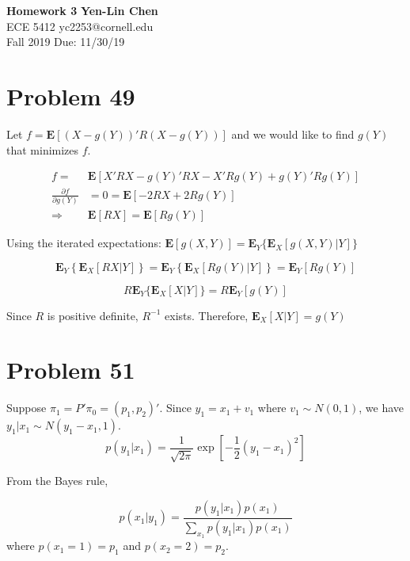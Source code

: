 \documentclass[a4paper, 11pt]{article}
\begin{document}
\noindent
\large\textbf{Homework 3} \hfill \textbf{Yen-Lin Chen} \\
\normalsize ECE 5412 \hfill yc2253@cornell.edu \\
Fall 2019 \hfill Due: 11/30/19\\

\section*{Problem 49}

Let $f = \mathbf{E}[(X-g(Y))'R(X-g(Y))]$ and we would like to find $g(Y)$ that minimizes $f$. 

\begin{equation}
\begin{split}
f = & \mathbf{E}[X'RX - g(Y)'RX - X'Rg(Y) + g(Y)'Rg(Y)]\\
\frac{\partial f}{\partial g(Y)} & = 0 = \mathbf{E}[-2RX + 2Rg(Y)]\\
\Longrightarrow & \mathbf{E}[RX] = \mathbf{E}[Rg(Y)]
\end{split}
\end{equation}

Using the iterated expectations: $\mathbf{E}[g(X,Y)] = \mathbf{E}_Y\{\mathbf{E}_X[g(X,Y)|Y]\}$

\begin{equation}
\mathbf{E}_Y\left\{ \mathbf{E}_X [RX | Y] \right\} = \mathbf{E}_Y\left\{ \mathbf{E}_X [Rg(Y) | Y] \right\} = \mathbf{E}_Y[Rg(Y)]
\end{equation}

\begin{equation}
R\mathbf{E}_Y\{\mathbf{E}_X[X|Y] \} = R\mathbf{E}_Y[g(Y)]
\end{equation}


Since $R$ is positive definite, $R^{-1}$ exists. Therefore, $\mathbf{E}_X[X|Y] = g(Y)$


\section*{Problem 51}

Suppose $\pi_1 = P'\pi_0 = (p_1, p_2)'$. Since $y_1 = x_1 + v_1$ where $v_1 \sim N(0,1 )$, we have $y_1|x_1 \sim N(y_1-x_1, 1)$. 
\begin{equation}
p(y_1|x_1) = \frac{1}{\sqrt{2\pi}}\exp\left[{-\frac{1}{2}(y_1-x_1)^2}\right]
\end{equation}

From the Bayes rule, 

\begin{equation}
p(x_1|y_1) = \frac{p(y_1|x_1)p(x_1)}{\sum_{x_1}p(y_1|x_1)p(x_1)}
\end{equation}
where $p(x_1=1) = p_1$ and $p(x_2=2) = p_2$.
\end{document}
